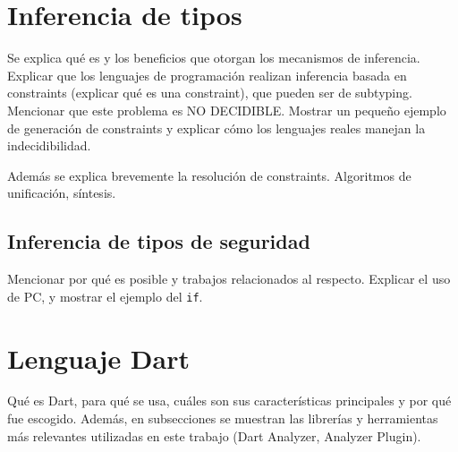 \section{Inferencia de tipos}
Se explica qué es y los beneficios que otorgan los mecanismos de inferencia. Explicar que los lenguajes de programación realizan inferencia basada en constraints (explicar qué es una constraint), que pueden ser de subtyping. Mencionar que este problema es NO DECIDIBLE. Mostrar un pequeño ejemplo de generación de constraints y explicar cómo los lenguajes reales manejan la indecidibilidad.

Además se explica brevemente la resolución de constraints. Algoritmos de unificación, síntesis.

\subsection{Inferencia de tipos de seguridad}
Mencionar por qué es posible y trabajos relacionados al respecto. Explicar el uso de PC, y mostrar el ejemplo del \texttt{if}.

\section{Lenguaje Dart}
Qué es Dart, para qué se usa, cuáles son sus características principales y por qué fue escogido. Además, en subsecciones se muestran las librerías y herramientas más relevantes utilizadas en este trabajo (Dart Analyzer, Analyzer Plugin).
